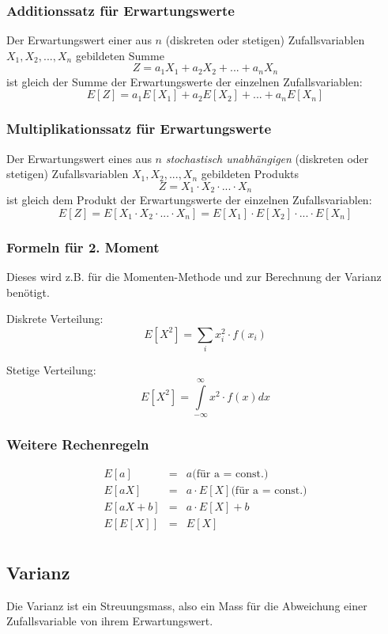 \documentclass[10pt,a4paper,twocolumn]{article}
\begin{document}
\subsubsection{Additionssatz für Erwartungswerte}
Der Erwartungswert einer aus $n$ (diskreten oder stetigen) Zufallsvariablen $X_1,X_2,...,X_n$ gebildeten Summe
\[
Z=a_1X_1+a_2X_2+...+a_nX_n
\]
ist gleich der Summe der Erwartungswerte der einzelnen Zufallsvariablen:
\[
E[Z]=a_1E[X_1]+a_2E[X_2]+...+a_nE[X_n]
\]

\subsubsection{Multiplikationssatz für Erwartungswerte}
Der Erwartungswert eines aus $n$ \emph{stochastisch unabhängigen} (diskreten oder stetigen) Zufallsvariablen $X_1,X_2,...,X_n$ gebildeten Produkts
\[
Z=X_1\cdot X_2\cdot ...\cdot X_n
\]
ist gleich dem Produkt der Erwartungswerte der einzelnen Zufallsvariablen:
\[
E[Z]=E[X_1\cdot X_2\cdot ...\cdot X_n]=E[X_1]\cdot E[X_2]\cdot ...\cdot E[X_n]
\]

\subsubsection{Formeln für 2. Moment}
Dieses wird z.B. für die Momenten-Methode und zur Berechnung der Varianz benötigt.

\vspace{10pt}

Diskrete Verteilung:
\[
E[X^2]=\sum\limits_{i} x_i^2\cdot f(x_i)
\]

Stetige Verteilung:
\[
E[X^2]=\int\limits_{-\infty}^{\infty}x^2\cdot f(x)dx
\]

\subsubsection{Weitere Rechenregeln}
\[
\begin{array}{rcl}
	E[a] & = & a \text{(für a = const.)} \\
	E[aX] & = & a \cdot E[X] \text{(für a = const.)} \\
	E[aX + b] & = & a \cdot E[X] + b \\	
	E[E[X]] & = & E[X] \\
\end{array}
\]

\subsection{Varianz}
Die Varianz ist ein Streuungsmass, also ein Mass für die Abweichung einer Zufallsvariable von ihrem Erwartungswert.
\end{document}
